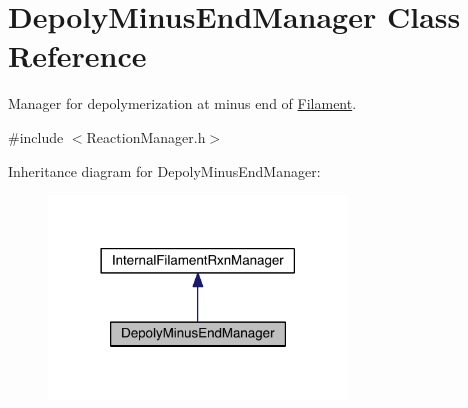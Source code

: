 \hypertarget{classDepolyMinusEndManager}{\section{Depoly\+Minus\+End\+Manager Class Reference}
\label{classDepolyMinusEndManager}
}


Manager for depolymerization at minus end of \hyperlink{classFilament}{Filament}.  




{\ttfamily \#include $<$Reaction\+Manager.\+h$>$}



Inheritance diagram for Depoly\+Minus\+End\+Manager\+:\nopagebreak
\begin{figure}[H]
\begin{center}
\leavevmode
\includegraphics[width=225pt]{classDepolyMinusEndManager__inherit__graph}
\end{center}
\end{figure}


